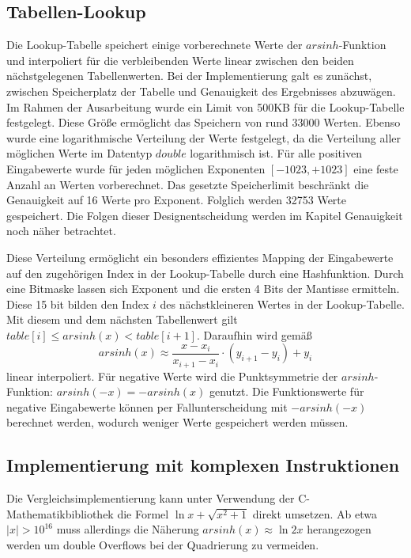\documentclass[course=erap] {aspdoc}
\begin{document}
    \subsection{Tabellen-Lookup}
    Die Lookup-Tabelle speichert einige vorberechnete Werte der $arsinh$-Funktion und interpoliert für die verbleibenden Werte linear zwischen den beiden nächstgelegenen Tabellenwerten.
    Bei der Implementierung galt es zunächst, zwischen Speicherplatz der Tabelle und Genauigkeit des Ergebnisses abzuwägen.
    Im Rahmen der Ausarbeitung wurde ein Limit von 500KB für die Lookup-Tabelle festgelegt.
    Diese Größe ermöglicht das Speichern von rund 33000 Werten.
    Ebenso wurde eine logarithmische Verteilung der Werte festgelegt, da die Verteilung aller möglichen Werte im Datentyp $double$ logarithmisch ist.
    Für alle positiven Eingabewerte wurde für jeden möglichen Exponenten $[-1023, +1023]$ eine feste Anzahl an Werten vorberechnet.
    Das gesetzte Speicherlimit beschränkt die Genauigkeit auf 16 Werte pro Exponent.
    Folglich werden 32753 Werte gespeichert.
    Die Folgen dieser Designentscheidung werden im Kapitel Genauigkeit noch näher betrachtet.

    Diese Verteilung ermöglicht ein besonders effizientes Mapping der Eingabewerte auf den zugehörigen Index in der Lookup-Tabelle durch eine Hashfunktion.
    Durch eine Bitmaske lassen sich Exponent und die ersten 4 Bits der Mantisse ermitteln.
    Diese 15 bit bilden den Index $i$ des nächstkleineren Wertes in der Lookup-Tabelle.
    Mit diesem und dem nächsten Tabellenwert gilt $table[i] \leq arsinh(x) < table[i+1]$.
    Daraufhin wird gemäß
    \[
        arsinh(x) \approx \frac{x-x_i}{x_{i+1} - x_i}\cdot (y_{i+1}-y_i) + y_i
    \]
    linear interpoliert.
    Für negative Werte wird die Punktsymmetrie der $arsinh$-Funktion: $arsinh(-x) = -arsinh(x)$ genutzt\cite{properties}.
    Die Funktionswerte für negative Eingabewerte können per Fallunterscheidung mit $-arsinh(-x)$ berechnet werden, wodurch weniger Werte gespeichert werden müssen.

    \subsection{Implementierung mit komplexen Instruktionen}
    Die Vergleichsimplementierung kann unter Verwendung der C-Mathematikbibliothek die Formel $\ln{x+\sqrt{x^2+1}}$ direkt umsetzen. Ab etwa $|x|>10^{16}$ muss allerdings die Näherung $arsinh(x)\approx \ln{2x}$ herangezogen werden um double Overflows bei der Quadrierung zu vermeiden.
\end{document}
